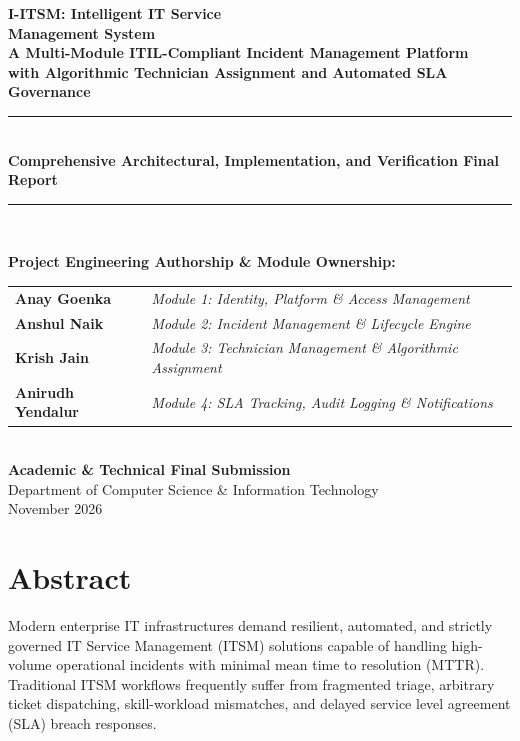 \documentclass[11pt,a4paper,oneside]{report}
\begin{document}
\begin{titlepage}
    \centering
    \vspace*{1.5cm}
    
    {\Huge \bfseries \textcolor{primaryblue}{I-ITSM: Intelligent IT Service\\Management System}}\\[0.8cm]
    {\Large \bfseries \textcolor{darkslate}{A Multi-Module ITIL-Compliant Incident Management Platform\\with Algorithmic Technician Assignment and Automated SLA Governance}}\\[1.5cm]
    
    \rule{\linewidth}{1.2pt}\\[0.6cm]
    {\large \textbf{Comprehensive Architectural, Implementation, and Verification Final Report}}\\[0.6cm]
    \rule{\linewidth}{1.2pt}\\[2.0cm]
    
    \begin{minipage}{0.85\textwidth}
    \centering
    \textbf{\Large Project Engineering Authorship \& Module Ownership:}\\[0.6cm]
    \begin{tabular}{ll}
        \textbf{Anay Goenka} & \textit{Module 1: Identity, Platform \& Access Management} \\
        \textbf{Anshul Naik} & \textit{Module 2: Incident Management \& Lifecycle Engine} \\
        \textbf{Krish Jain} & \textit{Module 3: Technician Management \& Algorithmic Assignment} \\
        \textbf{Anirudh Yendalur} & \textit{Module 4: SLA Tracking, Audit Logging \& Notifications} \\
    \end{tabular}
    \end{minipage}\\[2.5cm]
    
    \vfill
    {\large \textbf{Academic \& Technical Final Submission}}\\[0.3cm]
    {\normalsize Department of Computer Science \& Information Technology}\\[0.2cm]
    {\normalsize November 2026}
\end{titlepage}

\cleardoublepage
{}
{}
\chapter*{Abstract}
Modern enterprise IT infrastructures demand resilient, automated, and strictly governed IT Service Management (ITSM) solutions capable of handling high-volume operational incidents with minimal mean time to resolution (MTTR). Traditional ITSM workflows frequently suffer from fragmented triage, arbitrary ticket dispatching, skill-workload mismatches, and delayed service level agreement (SLA) breach responses. 
\end{document}
